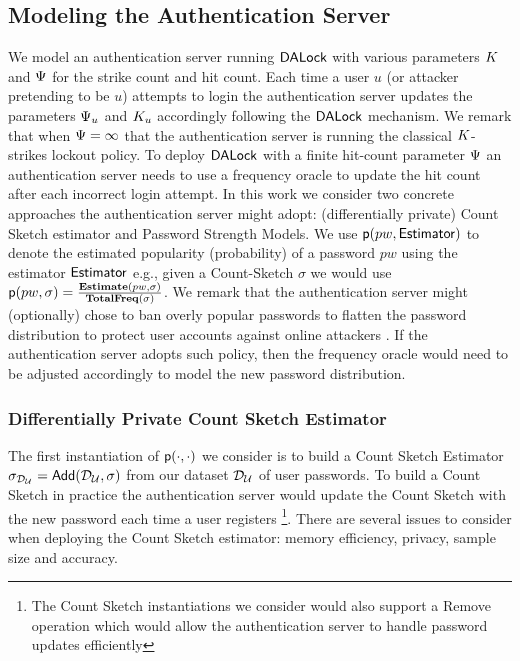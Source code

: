 
\subsection{Modeling the Authentication Server}\label{section:ExperimentDesign-subsection:SimulateServer} %

We model an authentication server running $\mathsf{DALock}$ with various parameters $K$ and $\Psi$ for the strike count and hit count. Each time a user $u$ (or attacker pretending to be $u$) attempts to login the authentication server updates the parameters $\Psi_{u}$ and $K_{u}$ accordingly following the $\mathsf{DALock}$ mechanism. We remark that when $ \Psi = \infty$ that the authentication server is running the classical $ K$-strikes lockout policy. To deploy $\mathsf{DALock}$ with a finite hit-count parameter $ \Psi$ an authentication server needs to use a frequency oracle to update the hit count after each incorrect login attempt.  In this work we consider two concrete approaches the authentication server might adopt: (differentially private) Count Sketch estimator and Password Strength Models. We use $\textsf{p}(pw,\mathsf{Estimator})$ to denote the estimated popularity (probability) of a password $pw$ using the estimator $\mathsf{Estimator}$ e.g., given a Count-Sketch $\sigma$ we would use  $\textsf{p}(pw,\sigma) = \frac{\mathbf{Estimate}(pw,\sigma)}{\mathbf{TotalFreq(\sigma)}}$. We remark that the authentication server might (optionally) chose to ban overly popular passwords to flatten the password distribution to protect user accounts against online attackers \cite{HTS:SchHerMit10}. If the authentication server adopts such policy, then the frequency oracle would need to be adjusted accordingly to model the new password distribution.



\subsubsection{Differentially Private Count Sketch Estimator} 

The first instantiation of $\textsf{p}(\cdot,\cdot) $ we consider is to build a Count Sketch Estimator $\sigma_{\mathcal{D}_{{\mathcal{U}}}} = \mathsf{Add}(\mathcal{D}_{{\mathcal{U}}},\sigma) $ from our dataset $\mathcal{D}_{{\mathcal{U}}} $ of user passwords. To build a Count Sketch in practice the authentication server would update the Count Sketch with the new password each time a user registers \footnote{The Count Sketch instantiations we consider would also support a Remove operation which would allow the authentication server to handle password updates efficiently}. There are several issues to consider when deploying the Count Sketch estimator: memory efficiency, privacy, sample size and accuracy. 


